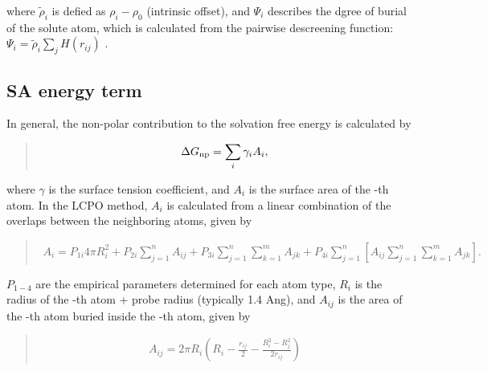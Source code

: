 \documentclass[a4paper,11pt,oneside,english]{sphinxmanual}
\begin{document}
where \({\tilde \rho _i}\) is defied as \(\rho_i - \rho_0\) (intrinsic offset), and
\(\Psi_{i}\) describes the dgree of burial of the solute atom,
which is calculated from the pairwise descreening
function: \({\Psi _i} = {{\tilde \rho _i}}\sum\limits_j {{H(r_{ij})}}\) .


\subsection{SA energy term}
\label{\detokenize{05_Energy:sa-energy-term}}
In general, the non-polar contribution to the solvation free energy is calculated by
\begin{quote}

\vspace{-5mm}
\begin{equation*}
\begin{split}\Delta {G_{{\rm{np}}}} = \sum\limits_i {{\gamma _i}{A_i}},\end{split}
\end{equation*}
\vspace{-3mm}
\end{quote}

where \(\gamma\) is the surface tension coefficient, and \(A_i\) is the surface area of the -th atom.
In the LCPO method, \(A_i\) is calculated from a linear combination of the overlaps between the
neighboring atoms, given by
\begin{quote}

\vspace{-5mm}
\begin{equation*}
\begin{split}{A_i} = {P_{1i}}4\pi R_i^2 + {P_{2i}}\sum\limits_{j = 1}^n {{A_{ij}}}  + {P_{3i}}\sum\limits_{j = 1}^n {\sum\limits_{k = 1}^m {{A_{jk}}} }  + {P_{4i}}\sum\limits_{j = 1}^n {\left[ {{A_{ij}}\sum\limits_{j = 1}^n {\sum\limits_{k = 1}^m {{A_{jk}}} } } \right]}.\end{split}
\end{equation*}
\vspace{-3mm}
\end{quote}

\(P_{1-4}\) are the empirical parameters determined for each atom type,
\(R_i\) is the radius of the -th atom + probe radius (typically 1.4 Ang),
and \(A_{ij}\) is the area of the -th atom buried inside the -th atom, given by
\begin{quote}

\vspace{-5mm}
\begin{equation*}
\begin{split}{A_{ij}} = 2\pi {R_i}\left( {{R_i} - \frac{{{r_{ij}}}}{2} - \frac{{R_i^2 - R_j^2}}{{2{r_{ij}}}}} \right)\end{split}
\end{equation*}
\vspace{-3mm}
\end{quote}
\end{document}
